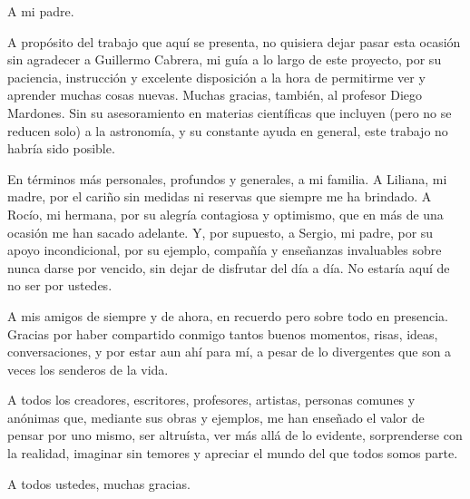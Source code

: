 \documentclass[upright, contnum]{umemoria}
\begin{document}
\begin{dedicatoria}
A mi padre.
\end{dedicatoria}

\begin{thanks}
A propósito del trabajo que aquí se presenta, no quisiera dejar pasar esta ocasión sin agradecer a Guillermo Cabrera, mi guía a lo largo de este proyecto, por su paciencia, instrucción y excelente disposición a la hora de permitirme ver y aprender muchas cosas nuevas. Muchas gracias, también, al profesor Diego Mardones. Sin su asesoramiento en materias científicas que incluyen (pero no se reducen solo) a la astronomía, y su constante ayuda en general, este trabajo no habría sido posible.

En términos más personales, profundos y generales, a mi familia. A Liliana, mi madre, por el cariño sin medidas ni reservas que siempre me ha brindado. A Rocío, mi hermana, por su alegría contagiosa y optimismo, que en más de una ocasión me han sacado adelante. Y, por supuesto, a Sergio, mi padre, por su apoyo incondicional, por su ejemplo, compañía y enseñanzas invaluables sobre nunca darse por vencido, sin dejar de disfrutar del día a día. No estaría aquí de no ser por ustedes.

A mis amigos de siempre y de ahora, en recuerdo pero sobre todo en presencia. Gracias por haber compartido conmigo tantos buenos momentos, risas, ideas, conversaciones, y por estar aun ahí para mí, a pesar de lo divergentes que son a veces los senderos de la vida.

A todos los creadores, escritores, profesores, artistas, personas comunes y anónimas que, mediante sus obras y ejemplos, me han enseñado el valor de pensar por uno mismo, ser altruísta, ver más allá de lo evidente, sorprenderse con la realidad, imaginar sin temores y apreciar el mundo del que todos somos parte.

A todos ustedes, muchas gracias.
\end{thanks}

\cleardoublepage
\begin{spacing}{1}
\tableofcontents
\listoffigures
\end{spacing}

\mainmatter








\nocite{*}


\end{document}
